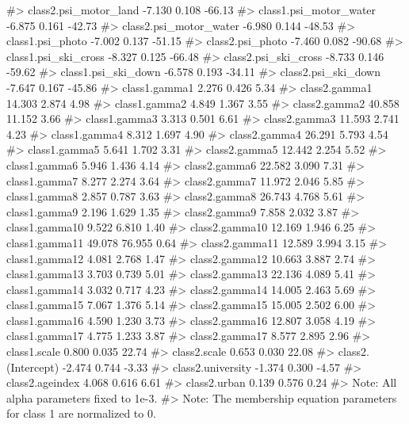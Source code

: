 \begin{Schunk}
\begin{Soutput}
#> class2.psi_motor_land       -7.130   0.108 -66.13
#> class1.psi_motor_water      -6.875   0.161 -42.73
#> class2.psi_motor_water      -6.980   0.144 -48.53
#> class1.psi_photo            -7.002   0.137 -51.15
#> class2.psi_photo            -7.460   0.082 -90.68
#> class1.psi_ski_cross        -8.327   0.125 -66.48
#> class2.psi_ski_cross        -8.733   0.146 -59.62
#> class1.psi_ski_down         -6.578   0.193 -34.11
#> class2.psi_ski_down         -7.647   0.167 -45.86
#> class1.gamma1                2.276   0.426   5.34
#> class2.gamma1               14.303   2.874   4.98
#> class1.gamma2                4.849   1.367   3.55
#> class2.gamma2               40.858  11.152   3.66
#> class1.gamma3                3.313   0.501   6.61
#> class2.gamma3               11.593   2.741   4.23
#> class1.gamma4                8.312   1.697   4.90
#> class2.gamma4               26.291   5.793   4.54
#> class1.gamma5                5.641   1.702   3.31
#> class2.gamma5               12.442   2.254   5.52
#> class1.gamma6                5.946   1.436   4.14
#> class2.gamma6               22.582   3.090   7.31
#> class1.gamma7                8.277   2.274   3.64
#> class2.gamma7               11.972   2.046   5.85
#> class1.gamma8                2.857   0.787   3.63
#> class2.gamma8               26.743   4.768   5.61
#> class1.gamma9                2.196   1.629   1.35
#> class2.gamma9                7.858   2.032   3.87
#> class1.gamma10               9.522   6.810   1.40
#> class2.gamma10              12.169   1.946   6.25
#> class1.gamma11              49.078  76.955   0.64
#> class2.gamma11              12.589   3.994   3.15
#> class1.gamma12               4.081   2.768   1.47
#> class2.gamma12              10.663   3.887   2.74
#> class1.gamma13               3.703   0.739   5.01
#> class2.gamma13              22.136   4.089   5.41
#> class1.gamma14               3.032   0.717   4.23
#> class2.gamma14              14.005   2.463   5.69
#> class1.gamma15               7.067   1.376   5.14
#> class2.gamma15              15.005   2.502   6.00
#> class1.gamma16               4.590   1.230   3.73
#> class2.gamma16              12.807   3.058   4.19
#> class1.gamma17               4.775   1.233   3.87
#> class2.gamma17               8.577   2.895   2.96
#> class1.scale                 0.800   0.035  22.74
#> class2.scale                 0.653   0.030  22.08
#> class2.(Intercept)          -2.474   0.744  -3.33
#> class2.university           -1.374   0.300  -4.57
#> class2.ageindex              4.068   0.616   6.61
#> class2.urban                 0.139   0.576   0.24
#> Note: All alpha parameters fixed to 1e-3. 
#> Note: The membership equation parameters for class 1 are normalized to 0.
\end{Soutput}
\end{Schunk}

